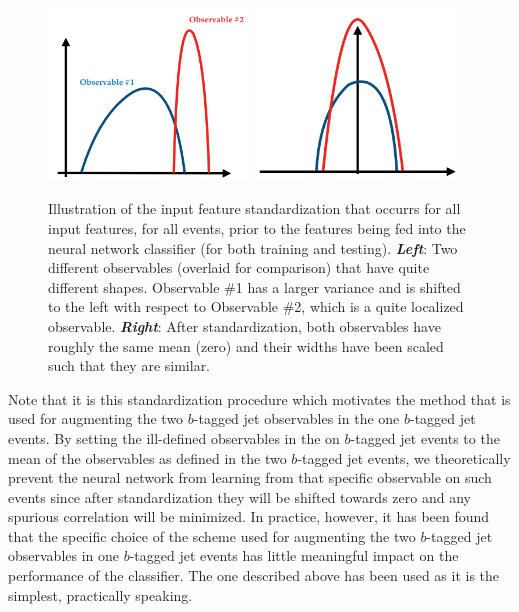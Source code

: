 \begin{figure}[!htb]
    \begin{center}
        \includegraphics[width=0.48\textwidth]{figures/search_hh/mva/feature_standard_1}
        \includegraphics[width=0.48\textwidth]{figures/search_hh/mva/feature_standard_2}
        \caption{
            Illustration of the input feature standardization that occurrs for all input features,
            for all events, prior to the features being fed into the neural network classifier
            (for both training and testing).
            \textit{\textbf{Left}}: Two different observables (overlaid for comparison) that have quite
            different shapes. Observable \#1 has a larger variance and is shifted to the left with
            respect to Observable \#2, which is a quite localized observable.
            \textit{\textbf{Right}}: After standardization, both observables have roughly the same
            mean (zero) and their widths have been scaled such that they are similar.
        }
        \label{fig:nn_feature_standard}
    \end{center}
\end{figure}

Note that it is this standardization procedure which motivates the method that
is used for augmenting the two $b$-tagged jet observables in the one $b$-tagged jet events.
By setting the ill-defined observables in the on $b$-tagged jet events to the mean of the observables
as defined in the two $b$-tagged jet events, we theoretically prevent the neural network from learning
from that specific observable on such events since after standardization they will be shifted towards zero
and any spurious correlation will be minimized.
In practice, however, it has been found that the specific choice of the scheme used for augmenting the two $b$-tagged jet observables
in one $b$-tagged jet events has little meaningful impact on the performance of the classifier.
The one described above has been used as it is the simplest, practically speaking.

